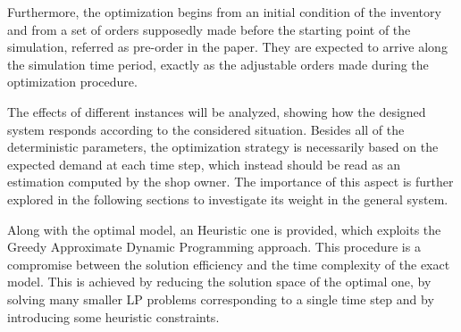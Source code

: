 \documentclass{article}
\begin{document}
Furthermore, the optimization begins from an initial condition of the inventory and from a set of orders supposedly made before the starting point of the simulation, referred as pre-order in the paper. They are expected to arrive along the simulation time period, exactly as the adjustable orders made during the optimization procedure.\par
The effects of different instances will be analyzed, showing how the designed system responds according to the considered situation. Besides all of the deterministic parameters, the optimization strategy is necessarily based on the expected demand at each time step, which instead should be read as an estimation computed by the shop owner. The importance of this aspect is further explored in the following sections to investigate its weight in the general system.\par
Along with the optimal model, an Heuristic one is provided, which exploits the Greedy Approximate Dynamic Programming approach. This procedure is a compromise between the solution efficiency and the time complexity of the exact model. This is achieved by reducing the solution space of the optimal one, by solving many smaller LP problems corresponding to a single time step and by introducing some heuristic constraints.

\end{document}
